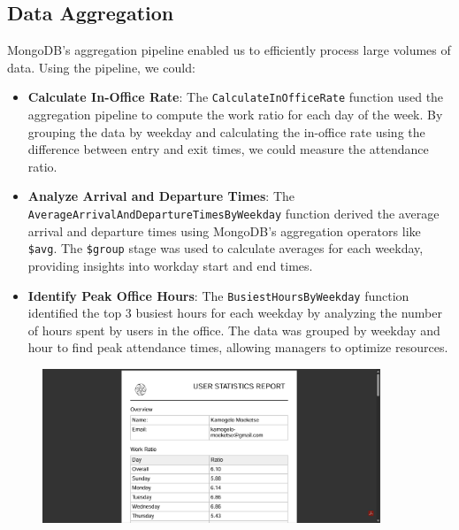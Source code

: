 \documentclass[11pt,a4paper]{article}
\begin{document}
\subsection*{Data Aggregation}
MongoDB's aggregation pipeline enabled us to efficiently process large volumes of data. Using the pipeline, we could:
\begin{itemize}
    \item \textbf{Calculate In-Office Rate}: The \texttt{CalculateInOfficeRate} function used the aggregation pipeline to compute the work ratio for each day of the week. 
    By grouping the data by weekday and calculating the in-office rate using the difference between entry and exit times, we could measure the attendance ratio.
    
    \item \textbf{Analyze Arrival and Departure Times}: The \texttt{AverageArrivalAndDepartureTimesByWeekday} function derived the average arrival and departure times using MongoDB’s 
    aggregation operators like \texttt{\$avg}. The \texttt{\$group} stage was used to calculate averages for each weekday, providing insights into workday start and end times.
    
    \item \textbf{Identify Peak Office Hours}: The \texttt{BusiestHoursByWeekday} function identified the top 3 busiest hours for each weekday by analyzing the 
    number of hours spent by users in the office. The data was grouped by weekday and hour to find peak attendance times, allowing managers to optimize resources.
\end{itemize}

\begin{figure}[htbp]
    \centering
    \includegraphics[width=0.9\textwidth]{User_Reports.png}
\end{figure}
\end{document}
